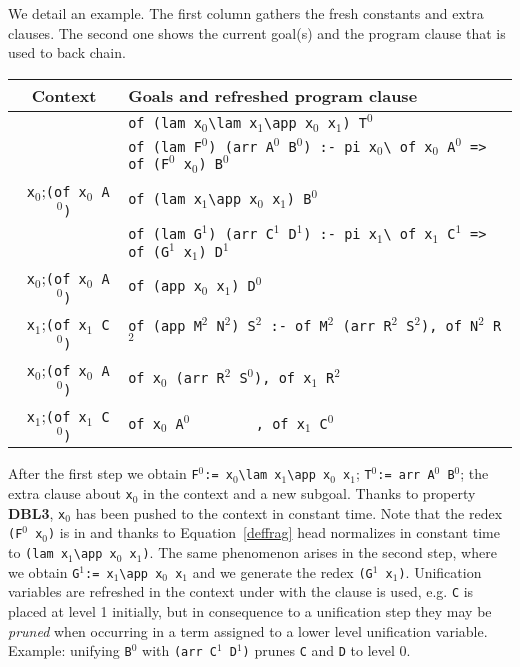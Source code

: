 \documentclass{llncs}
\begin{document}
We detail an example.
The first column gathers the fresh constants and extra clauses. The
second one shows the current goal(s) and the program clause that is
used to back chain.

\begin{center}
\small
\begin{tabular}{c|l}
Context & Goals and refreshed program clause \\\hline
& \verb+of (lam x+$_0$\verb+\lam x+$_1$\verb+\app x+$_0$\verb+ x+$_1$\verb+) T+$^0$ \\
& \verb+of (lam F+$^0$\verb+) (arr A+$^0$\verb+ B+$^0$\verb+) :- pi x+$_0$\verb+\ of x+$_0$\verb+ A+$^0$\verb+ => of (F+$^0$\verb+ x+$_0$\verb+) B+$^0$ \\\hline
\verb+ x+$_0$;\verb+(of x+$_0$\verb+ A+$^0$\verb+)+ & \verb+of (lam x+$_1$\verb+\app x+$_0$\verb+ x+$_1$\verb+) B+$^0$ \\
& \verb+of (lam G+$^1$\verb+) (arr C+$^1$\verb+ D+$^1$\verb+) :- pi x+$_1$\verb+\ of x+$_1$\verb+ C+$^1$\verb+ => of (G+$^1$\verb+ x+$_1$\verb+) D+$^1$\verb++ \\\hline
\verb+ x+$_0$;\verb+(of x+$_0$\verb+ A+$^0$\verb+)+ & \verb+of (app x+$_0$\verb+ x+$_1$\verb+) D+$^0$ \\
\verb+ x+$_1$;\verb+(of x+$_1$\verb+ C+$^0$\verb+)+ & \verb+of (app M+$^2$\verb+ N+$^2$\verb+) S+$^2$\verb+ :- of M+$^2$\verb+ (arr R+$^2$\verb+ S+$^2$\verb+), of N+$^2$\verb+ R+$^2$ \\\hline
\verb+ x+$_0$;\verb+(of x+$_0$\verb+ A+$^0$\verb+)+ & \verb+of x+$_0$\verb+ (arr R+$^2$\verb+ S+$^0$\verb+), of x+$_1$\verb+ R+$^2$ \\
\verb+ x+$_1$;\verb+(of x+$_1$\verb+ C+$^0$\verb+)+ & \verb+of x+$_0$\verb+ A+$^0$\hspace{4pt}\verb+        , of x+$_1$\verb+ C+$^0$ \\\hline
\end{tabular}
\end{center}

After the first step we obtain
\verb+F+$^0$\verb+:= x+$_0$\verb+\lam x+$_1$\verb+\app x+$_0$\verb+ x+$_1$;
\verb+T+$^0$\verb+:= arr A+$^0$\verb+ B+$^0$; the extra clause
about \verb+x+$_0$ in the context and a new subgoal.
Thanks to property \textbf{DBL3}, \verb+x+$_0$ has been pushed to the context
in constant time.
Note that the redex \verb+(F+$^0$\verb+ x+$_0$\verb+)+ is in \rff{} and
thanks to Equation~\ref{deffrag} head normalizes in constant time
to \verb+(lam x+$_1$\verb+\app x+$_0$\verb+ x+$_1$\verb+)+.
The same phenomenon arises in the second step,
where we obtain \verb+G+$^1$\verb+:= x+$_1$\verb+\app x+$_0$\verb+ x+$_1$
and we generate the redex \verb+(G+$^1$\verb+ x+$_1$\verb+)+.
Unification variables are refreshed in the context under with
the clause is used, e.g. \verb+C+ is placed at level 1 initially,
but in consequence to a unification step they may be \emph{pruned}
when occurring in a term assigned to a lower level unification
variable. Example: unifying
\verb+B+$^0$ with \verb+(arr C+$^1$\verb+ D+$^1$\verb+)+ prunes
\verb+C+ and \verb+D+ to level 0.
\end{document}
